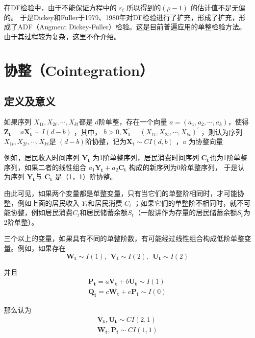 		在DF检验中，由于不能保证方程中的 $ \varepsilon_{t} $ 所以得到的$ (\rho -1 ) $ 的估计值不是无偏的。
		于是Dickey和Fuller于1979、1980年对DF检验进行了扩充，形成了扩充，形成了ADF（Augment Dickey-Fuller）检验。这是目前普遍应用的单整检验方法。由于其过程较为复杂，这里不作介绍。
		
\section{协整（Cointegration）}
	\subsection{定义及意义}
		如果序列 $ X_{1 t}, X_{2 t}, \cdots, X_{k t} $都是 $ d $阶单整，存在一个向量 
		$ a=\left(a_{1}, a_{2}, \cdots, a_{k}\right) $，使得 
		$ \boldsymbol{Z_{t}}=a \boldsymbol{X_{t}^{\prime}} \sim I(d-b) $ ，其中，
		$ b>0, \boldsymbol{X_{t}^{\prime}} = \left(X_{1 t}, X_{2 t}, \cdots, X_{k t}\right)^{\prime} $ ，则认为序列
		$ X_{1 t}, X_{2 t}, \cdots, X_{k t} $是 $ (d-b) $阶协整，记为$ \boldsymbol{X_{t}} \sim C I(d, b) $ ，$ a $ 为协整向量
		
		例如，居民收入时间序列 $ \boldsymbol{Y_{t}} $ 为1阶单整序列，居民消费时间序列 $ \boldsymbol{C_{t}} $也为1阶单整序列，如果二者的线性组合
		$ a_{1}\boldsymbol{Y_{t}} + a_{2} \boldsymbol{C_{t}}$ 构成的新序列为0阶单整序列，
		于是认为序列 $ \boldsymbol{Y_{t}} $与 $ \boldsymbol{C_{t}} $ 是（1，1）阶协整。
		
		由此可见，如果两个变量都是单整变量，只有当它们的单整阶相同时，才可能协整，例如上面的居民收入 $ Y_{t} $和居民消费 $ C_{t} $ ；如果它们的单整阶不相同时，就不可能协整，例如居民消费$ C_{t} $和居民储蓄余额$ S_{t} $（一般讲作为存量的居民储蓄余额$ S_{t} $为2阶单整）。
		
		三个以上的变量，如果具有不同的单整阶数，有可能经过线性组合构成低阶单整变量。例如，如果存在
		$$ \boldsymbol{W_{t}} \sim I(1),\ \ \boldsymbol{V_{t}} \sim I(2), \ \ \boldsymbol{U_{t}} \sim I(2) $$
		
		并且
		$$\begin{array}{l}
			\boldsymbol{P_{t}}  =  a \boldsymbol{V_{t}} + b \boldsymbol{U_{t}} \sim I(1) \\ 
			\boldsymbol{Q_{t}}  =  c \boldsymbol{W_{t}} + e \boldsymbol{P_{t}} \sim I(0) 
		\end{array} $$
		
		那么认为
		$$ \begin{array}{l}
			\boldsymbol{V_{t}, U_{t}} \sim C I(2,1) \\
			\boldsymbol{W_{t}, P_{t}} \sim C I(1,1)
		\end{array} $$
		
